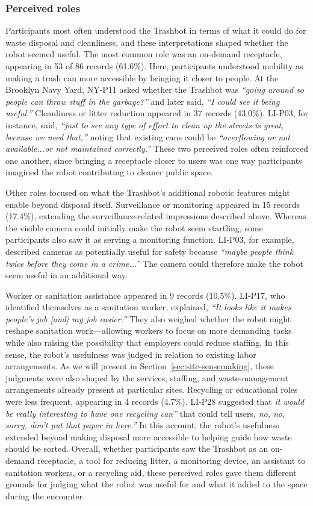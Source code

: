 \subsubsection{Perceived roles}

Participants most often understood the Trashbot in terms of what it could do for waste disposal and cleanliness, and these interpretations shaped whether the robot seemed useful. The most common role was an on-demand receptacle, appearing in 53 of 86 records (61.6\%). Here, participants understood mobility as making a trash can more accessible by bringing it closer to people. At the Brooklyn Navy Yard, NY-P11 asked whether the Trashbot was \emph{``going around so people can throw stuff in the garbage?''} and later said, \emph{``I could see it being useful.''} Cleanliness or litter reduction appeared in 37 records (43.0\%). LI-P03, for instance, said, \emph{``just to see any type of effort to clean up the streets is great, because we need that,''} noting that existing cans could be \emph{``overflowing or not available...or not maintained correctly.''} These two perceived roles often reinforced one another, since bringing a receptacle closer to users was one way participants imagined the robot contributing to cleaner public space.

Other roles focused on what the Trashbot's additional robotic features might enable beyond disposal itself. Surveillance or monitoring appeared in 15 records (17.4\%), extending the surveillance-related impressions described above. Whereas the visible camera could initially make the robot seem startling, some participants also saw it as serving a monitoring function. LI-P03, for example, described cameras as potentially useful for safety because \emph{``maybe people think twice before they come in a crime...''} The camera could therefore make the robot seem useful in an additional way. 

Worker or sanitation assistance appeared in 9 records (10.5\%). LI-P17, who identified themselves as a sanitation worker, explained, \emph{``It looks like it makes people's job [and] my job easier.''} They also weighed whether the robot might reshape sanitation work—allowing workers to focus on more demanding tasks while also raising the possibility that employers could reduce staffing. In this sense, the robot’s usefulness was judged in relation to existing labor arrangements. As we will present in Section~\ref{sec:site-sensemaking}, these judgments were also shaped by the services, staffing, and waste-management arrangements already present at particular sites. Recycling or educational roles were less frequent, appearing in 4 records (4.7\%). LI-P28 suggested that \emph{it would be really interesting to have one recycling can''} that could tell users, \emph{no, no, sorry, don't put that paper in here.''} In this account, the robot's usefulness extended beyond making disposal more accessible to helping guide how waste should be sorted. Overall, whether participants saw the Trashbot as an on-demand receptacle, a tool for reducing litter, a monitoring device, an assistant to sanitation workers, or a recycling aid, these perceived roles gave them different grounds for judging what the robot was useful for and what it added to the space during the encounter.

